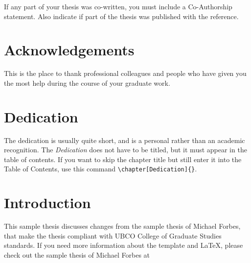 \documentclass[msc,oneside]{ubcthesis}%
\begin{document}
If any part of your thesis was co-written, you must include a
Co-Author\-ship statement. Also indicate if part of the thesis was published with the reference.

\newpage
{} \label{tableofcontent}%
\tableofcontents                %
\newpage 
{} \label{listoftab}%
\listoftables                   %
\newpage
{} \label{listoffig}%
\listoffigures                  %


\chapter{Acknowledgements}      %
This is the place to thank professional colleagues and people who have
given you the most help during the course of your graduate work.

\chapter{Dedication} %
The dedication is usually quite short, and is a personal rather than
an academic recognition.  The \emph{Dedication} does not have to be
titled, but it must appear in the table of contents.  If you want to
skip the chapter title but still enter it into the Table of Contents,
use this command \verb|\chapter[Dedication]{}|.




\mainmatter


\chapter{Introduction}
This sample thesis discusses changes from the sample thesis of Michael Forbes, that make the thesis compliant with UBCO College of Graduate Studies standards. If you need more information about the template and LaTeX, please check out the sample thesis of Michael Forbes at
\end{document}
